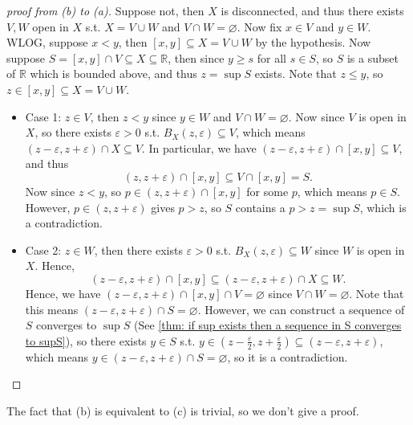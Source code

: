 \begin{proof}[proof from (b) to (a)]
    Suppose not, then \(X\) is disconnected, and thus there exists \(V, W\) open in \(X\) s.t. \(X = V \cup W\) and \(V \cap W = \varnothing \). Now fix \(x \in V\) and \(y \in W\). WLOG, suppose \(x < y\), then \([x, y] \subseteq X = V \cup W\) by the hypothesis. Now suppose \(S = [x, y] \cap V \subseteq X \subseteq \mathbb{R} \), then since \(y \ge s\) for all \(s \in S\), so \(S\) is a subset of \(\mathbb{R} \) which is bounded above, and thus \(z = \sup S\) exists. Note that \(z \le y\), so \(z \in [x, y] \subseteq X = V \cup W\). 
    \begin{itemize}
        \item Case 1: \(z \in V\), then \(z < y\) since \(y \in W\) and \(V \cap W = \varnothing \). Now since \(V\) is open in \(X\), so there exists \(\varepsilon > 0\) s.t. \(B_X(z, \varepsilon ) \subseteq V\), which means \((z - \varepsilon , z + \varepsilon ) \cap X \subseteq V\). In particular, we have \((z - \varepsilon , z + \varepsilon ) \cap [x, y] \subseteq V\), and thus
        \[
            (z, z + \varepsilon ) \cap [x, y] \subseteq V \cap [x, y] = S.
        \] Now since \(z < y\), so \(p \in (z, z+ \varepsilon ) \cap [x, y]\) for some \(p\), which means \(p \in S\). However, \(p \in (z, z + \varepsilon )\) gives \(p > z\), so \(S\) contains a \(p > z = \sup S\), which is a contradiction. 
        \item Case 2: \(z \in W\), then there exists \(\varepsilon > 0\) s.t. \(B_X(z, \varepsilon ) \subseteq W\) since \(W\) is open in \(X\). Hence, 
        \[
            (z - \varepsilon , z + \varepsilon ) \cap [x, y] \subseteq (z - \varepsilon , z + \varepsilon ) \cap X \subseteq W. 
        \]
        Hence, we have \((z - \varepsilon , z + \varepsilon ) \cap [x, y] \cap V = \varnothing \) since \(V \cap W = \varnothing \). Note that this means \((z - \varepsilon, z + \varepsilon) \cap S = \varnothing \). However, we can construct a sequence of \(S\) converges to \(\sup S\) (See \autoref{thm: if sup exists then a sequence in S converges to supS}), so there exists \(y \in S\) s.t. \(y \in \left( z - \frac{\varepsilon}{2}, z + \frac{\varepsilon}{2} \right) \subseteq (z - \varepsilon , z + \varepsilon )\), which means \(y \in (z - \varepsilon , z + \varepsilon ) \cap S = \varnothing \), so it is a contradiction.         
    \end{itemize}                 
\end{proof}

\begin{remark}
    The fact that (b) is equivalent to (c) is trivial, so we don't give a proof.
\end{remark}